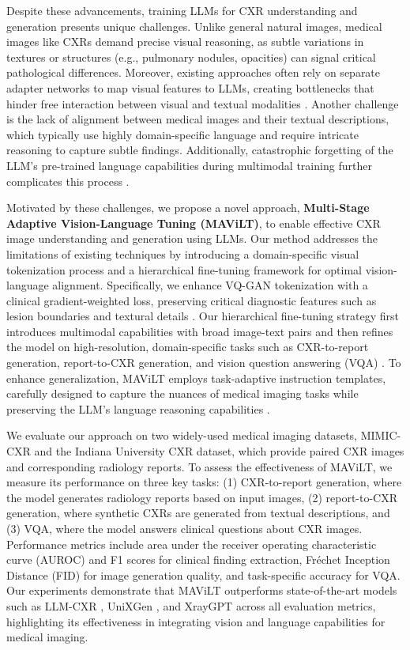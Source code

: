 Despite these advancements, training LLMs for CXR understanding and generation presents unique challenges. Unlike general natural images, medical images like CXRs demand precise visual reasoning, as subtle variations in textures or structures (e.g., pulmonary nodules, opacities) can signal critical pathological differences. Moreover, existing approaches often rely on separate adapter networks to map visual features to LLMs, creating bottlenecks that hinder free interaction between visual and textual modalities \cite{xu2024introspection}. Another challenge is the lack of alignment between medical images and their textual descriptions, which typically use highly domain-specific language and require intricate reasoning to capture subtle findings. Additionally, catastrophic forgetting of the LLM's pre-trained language capabilities during multimodal training further complicates this process \cite{waytowich2024benchmarking}.

Motivated by these challenges, we propose a novel approach, \textbf{Multi-Stage Adaptive Vision-Language Tuning (MAViLT)}, to enable effective CXR image understanding and generation using LLMs. Our method addresses the limitations of existing techniques by introducing a domain-specific visual tokenization process and a hierarchical fine-tuning framework for optimal vision-language alignment. Specifically, we enhance VQ-GAN tokenization with a clinical gradient-weighted loss, preserving critical diagnostic features such as lesion boundaries and textural details \cite{bucciarelli2024personalizing}. Our hierarchical fine-tuning strategy first introduces multimodal capabilities with broad image-text pairs and then refines the model on high-resolution, domain-specific tasks such as CXR-to-report generation, report-to-CXR generation, and vision question answering (VQA) \cite{song2024exploring}. To enhance generalization, MAViLT employs task-adaptive instruction templates, carefully designed to capture the nuances of medical imaging tasks while preserving the LLM's language reasoning capabilities \cite{huang2024video}.

We evaluate our approach on two widely-used medical imaging datasets, MIMIC-CXR \cite{wang2024large} and the Indiana University CXR dataset, which provide paired CXR images and corresponding radiology reports. To assess the effectiveness of MAViLT, we measure its performance on three key tasks: (1) CXR-to-report generation, where the model generates radiology reports based on input images, (2) report-to-CXR generation, where synthetic CXRs are generated from textual descriptions, and (3) VQA, where the model answers clinical questions about CXR images. Performance metrics include area under the receiver operating characteristic curve (AUROC) and F1 scores for clinical finding extraction, Fréchet Inception Distance (FID) for image generation quality, and task-specific accuracy for VQA. Our experiments demonstrate that MAViLT outperforms state-of-the-art models such as LLM-CXR \cite{lee2024multimodal}, UniXGen \cite{ratzlaff2024training}, and XrayGPT \cite{garg2023multimodal} across all evaluation metrics, highlighting its effectiveness in integrating vision and language capabilities for medical imaging.

